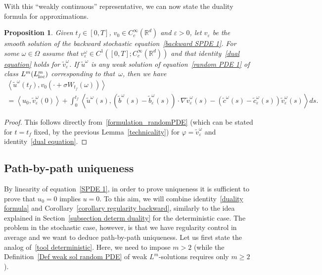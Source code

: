 \documentclass[a4paper,10pt]{article}
\newtheorem{proposition}[theorem]{Proposition}
\newcommand\1{\mathbbm{1}}
\newcommand{\eps}{\varepsilon}
\newcommand\loc{{\rm loc}}
\numberwithin{equation}{section}
\begin{document}
With this ``weakly continuous'' representative, we can now state the duality formula for approximations.

\begin{proposition}
Given $t_{f}\in [0,T]$, $v_{0}\in C_{c}^{\infty}(\mathbb{R}^{d})$ and $\varepsilon>0$, let $v_{\eps}$ be the smooth solution of the backward stochastic equation~\eqref{backward SPDE 1}. For some $\omega\in\Omega$ assume that $v_{\eps}^\omega\in C^{1}([0,T];C_{c}^{\infty}(\mathbb{R}^{d}))$ and that identity~\eqref{dual equation} holds for $\widetilde{v}_{\eps}^\omega$. If  $\widetilde{u}^\omega$ is any weak solution of equation~\eqref{random PDE 1} of class $L^{m}(L^{m}_\loc)$ corresponding to that~$\omega$, then we have 
\begin{multline}
\left\langle \widetilde{u}^\omega(t_{f}) ,v_{0}(\cdot+\sigma W_{t_{f}}(\omega))  \right\rangle
\label{duality formula} \\
 = \left\langle u_{0},\widetilde{v}_{\eps}^\omega(0) \right\rangle +\int_{0}^{t_{f}}\left\langle \widetilde{u}^\omega(s),(\widetilde{b}^\omega(s)  -\widetilde{b}_{\eps}^\omega(s))  \cdot\nabla\widetilde{v}_{\eps}^\omega(s)  - (  \widetilde{c}^\omega(s) -\widetilde{c}_{\eps}^\omega(s))  \widetilde{v}_{\eps}^\omega(s)  \right\rangle ds .
\end{multline}
\end{proposition}

\begin{proof}
This follows directly from~\eqref{formulation_randomPDE} (which can be stated for $t=t_f$ fixed, by the previous Lemma~\ref{technicality}) for $\varphi = \widetilde{v}_{\eps}^\omega$ and identity~\eqref{dual equation}.
\end{proof}

\subsection{Path-by-path uniqueness\label{subsection path by path uniq}}

By linearity of equation~\eqref{SPDE 1}, in order to prove uniqueness it is sufficient to prove that $u_{0}=0$ implies $u=0$. To this aim, we will combine identity~\eqref{duality formula} and Corollary~\ref{corollary regularity backward}, similarly to the idea explained in Section~\ref{subsection determ duality} for the deterministic case. The problem in the stochastic case, however, is that we have regularity control in average and we want to deduce path-by-path uniqueness. Let us first state the analog of~\eqref{tool deterministic}. Here, we need to impose $m>2$ (while the Definition~\ref{Def weak sol random PDE} of weak $L^m$-solutions requires only $m\geq2$). 
\end{document}
